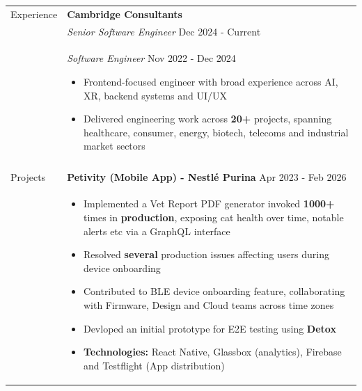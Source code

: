 \documentclass[11pt]{article}
\begin{document}
\begin{minipage}[t][0pt]{\linewidth}
\begin{tabular}[t]{p{2cm} p{14cm}}
	               \\

	               {Experience}        &
	               \textbf{Cambridge Consultants}                                                                                                                                                                                                      \\ &

	               \textit{Senior Software Engineer} \hfill Dec 2024 - Current
	               \\ &
	               \textit{Software Engineer} \hfill Nov 2022 - Dec 2024
	               \begin{itemize}
		               \renewcommand{\labelitemi}{$\diamond$}
		               \item Frontend-focused engineer with broad experience across AI, XR, backend systems and UI/UX
		               \item Delivered engineering work across \textbf{20+} projects, spanning healthcare, consumer, energy, biotech, telecoms and industrial market sectors
	               \end{itemize}                                                               \\ &


	               \\
	               {Projects}          &
	               \textbf{Petivity (Mobile App) - Nestlé Purina}  \hfill Apr 2023 - Feb 2026                                                                                                                                                          \\ &
	               \begin{itemize}
		               \renewcommand{\labelitemi}{$\diamond$}
		               \item Implemented a Vet Report PDF generator invoked \textbf{1000+} times in \textbf{production}, exposing cat health over time, notable alerts etc via a GraphQL interface
		               \item Resolved \textbf{several} production issues affecting users during device onboarding
		               \item Contributed to BLE device onboarding feature, collaborating with Firmware, Design and Cloud teams across time zones
		               \item Devloped an initial prototype for E2E testing using \textbf{Detox}
		               \item \textbf{Technologies:} React Native, Glassbox (analytics), Firebase and Testflight (App distribution)


\end{itemize}
\end{tabular}
\end{minipage}
\end{document}
